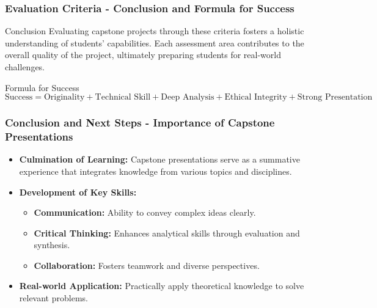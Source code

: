 \documentclass{beamer}
\begin{document}
\begin{frame}[fragile]
    \frametitle{Evaluation Criteria - Conclusion and Formula for Success}
    \begin{block}{Conclusion}
        Evaluating capstone projects through these criteria fosters a holistic understanding of students' capabilities. Each assessment area contributes to the overall quality of the project, ultimately preparing students for real-world challenges.
    \end{block}
    \begin{block}{Formula for Success}
        \[
        \text{Success} = \text{Originality} + \text{Technical Skill} + \text{Deep Analysis} + \text{Ethical Integrity} + \text{Strong Presentation}
        \]
    \end{block}
\end{frame}

\begin{frame}[fragile]
    \frametitle{Conclusion and Next Steps - Importance of Capstone Presentations}
    \begin{itemize}
        \item \textbf{Culmination of Learning:} 
        Capstone presentations serve as a summative experience that integrates knowledge from various topics and disciplines.
        
        \item \textbf{Development of Key Skills:}
        \begin{itemize}
            \item \textbf{Communication:} Ability to convey complex ideas clearly.
            \item \textbf{Critical Thinking:} Enhances analytical skills through evaluation and synthesis.
            \item \textbf{Collaboration:} Fosters teamwork and diverse perspectives.
        \end{itemize}

        \item \textbf{Real-world Application:} 
        Practically apply theoretical knowledge to solve relevant problems.
    \end{itemize}
\end{frame}
\end{document}
